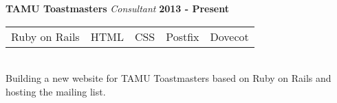 \documentclass[margin,line]{res}
\begin{document}
{\begin{resume}
{\bf TAMU Toastmasters} {\em Consultant} \hfill {\bf 2013 - Present} \
\\
\begin{tabular}{l l l l l}
   Ruby on Rails  & HTML  & CSS  & Postfix  & Dovecot
\end{tabular}
\\
Building a new website for TAMU Toastmasters based on Ruby on Rails and
\\ hosting the mailing list.
\vspace{-.13in}

%




\end{resume}}
\end{document}
